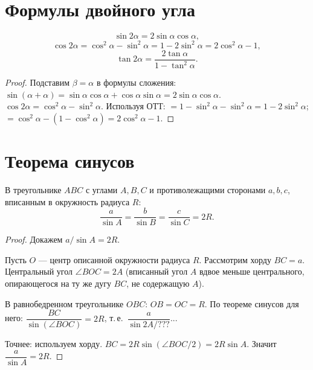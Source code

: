 \documentclass[12pt]{article}
\begin{document}
\section{Формулы двойного угла}

\begin{theorem}
\[
\sin 2\alpha = 2\sin\alpha\cos\alpha,
\]
\[
\cos 2\alpha = \cos^2\alpha - \sin^2\alpha = 1 - 2\sin^2\alpha
= 2\cos^2\alpha - 1,
\]
\[
\tan 2\alpha = \frac{2\tan\alpha}{1 - \tan^2\alpha}.
\]
\end{theorem}

\begin{proof}
Подставим $\beta = \alpha$ в формулы сложения:
$\sin(\alpha+\alpha) = \sin\alpha\cos\alpha + \cos\alpha\sin\alpha = 2\sin\alpha\cos\alpha$.
$\cos 2\alpha = \cos^2\alpha - \sin^2\alpha$.
Используя ОТТ: $= 1 - \sin^2\alpha - \sin^2\alpha = 1 - 2\sin^2\alpha$;
$= \cos^2\alpha - (1 - \cos^2\alpha) = 2\cos^2\alpha - 1$.
\end{proof}

\section{Теорема синусов}

\begin{theorem}
В треугольнике $ABC$ с углами $A,B,C$ и противолежащими сторонами
$a,b,c$, вписанным в окружность радиуса $R$:
\[
\frac{a}{\sin A} = \frac{b}{\sin B} = \frac{c}{\sin C} = 2R.
\]
\end{theorem}

\begin{proof}
Докажем $a / \sin A = 2R$.

Пусть $O$ --- центр описанной окружности радиуса $R$.
Рассмотрим хорду $BC = a$. Центральный угол $\angle BOC = 2A$
(вписанный угол $A$ вдвое меньше центрального, опирающегося
на ту же дугу $BC$, не содержащую $A$).

В равнобедренном треугольнике $OBC$: $OB = OC = R$.
По теореме синусов для него:
$\dfrac{BC}{\sin(\angle BOC)} = 2R$, т.\,е.\
$\dfrac{a}{\sin 2A / ???}$...

Точнее: используем хорду. $BC = 2R\sin(\angle BOC / 2) = 2R\sin A$.
Значит $\dfrac{a}{\sin A} = 2R$.
\end{proof}

\end{document}
